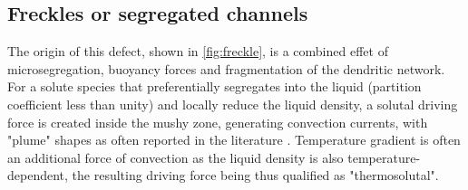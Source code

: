 \subsection*{Freckles or segregated channels} 
%
The origin of this defect, shown in \cref{fig:freckle}, is a combined effet of microsegregation, buoyancy forces and
fragmentation of the dendritic network. 
For a solute species that preferentially segregates into the liquid (partition coefficient less than unity)
and locally reduce the liquid density, a solutal driving force is created inside the mushy zone, generating convection currents, 
with "plume" shapes as often reported in the literature \citep{sarazin_studies_1992, schneider_modeling_1997,
saad_simulation_2015}. Temperature gradient is often an additional force of convection as the liquid density is also temperature-dependent, 
the resulting driving force being thus qualified as "thermosolutal".

